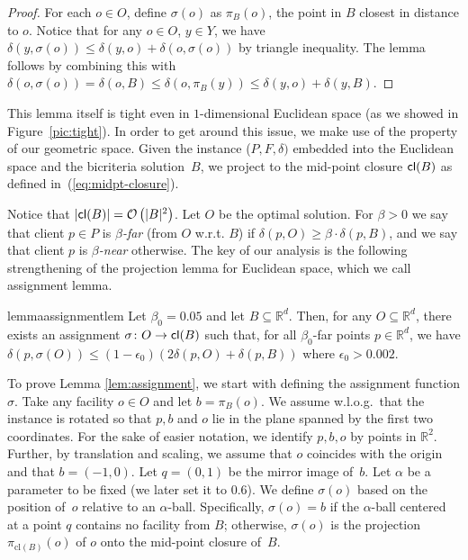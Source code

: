 \documentclass[11pt]{article}
\newcommand{\bR}{\ensuremath{\mathbb{R}}\xspace}
\newcommand{\bigO}[1]{\ensuremath{\mathcal{O}\left(#1\right)}}
\begin{document}
\projection*
\begin{proof}
    For each $o \in O$, define $\sigma(o)$ as $\pi_B(o)$, the point in $B$ closest in distance to $o$. Notice that for any $o\in O$, $y\in Y$, we have $\delta(y, \sigma(o)) \leq \delta(y,o) + \delta(o, \sigma(o))$ by triangle inequality. The lemma follows by combining this with $\delta(o, \sigma(o)) = \delta(o,B) \leq \delta(o, \pi_B(y)) \leq \delta(y, o)+\delta(y,B)$.
\end{proof}


This lemma itself is tight even in $1$-dimensional Euclidean space (as we showed in Figure~\ref{pic:tight}). In order to get around this issue, we make use of the property of our geometric space. Given the instance ($P, F, \delta)$ embedded into the Euclidean space and the bicriteria solution~$B$, we project to the mid-point closure ${\sf cl}(B)$ as defined in~(\ref{eq:midpt-closure}).

Notice that $|{\sf cl}(B)| = \bigO{|B|^2}$. Let $O$ be the optimal solution. For $\beta >0$ we say that client $p \in P$ is \emph{$\beta$-far} (from $O$ w.r.t. $B$) if $\delta(p,O) \geq \beta \cdot \delta(p,B)$, and we say that client $p$ is \emph{$\beta$-near} otherwise.
 The key of our analysis is the following strengthening of the projection lemma for Euclidean space, which we call assignment lemma.
 
\begin{restatable}{lemma}{assignmentlem}
\label{lem:assignment}
 Let $\beta_0 = 0.05$ and let $B \subseteq {\mathbb R}^d$. Then, for any $O \subseteq {\mathbb R}^d$, there exists an assignment $\sigma\colon O \rightarrow {\sf cl}(B)$ such that, for all $\beta_0$-far points $p \in {\mathbb R}^d$, we have $\delta(p, \sigma(O)) \leq (1-\epsilon_0)(2 \delta(p, O) + \delta(p, B))$ where $\epsilon_0 > 0.002$.
\end{restatable}
    
To prove Lemma \ref{lem:assignment}, we start with defining the assignment function $\sigma$. 
Take any facility $o \in O$ and let $b = \pi_B(o)$. We assume w.l.o.g.\ that the instance is rotated so that $p,b$ and $o$ lie in the plane spanned by the first two coordinates. For the sake of easier notation, we identify $p,b,o$ by points in $\bR^2$. Further, by translation and scaling, we assume that $o$ coincides with the origin and that $b=(-1,0)$. Let $q=(0,1)$ be the mirror image of~$b$. Let $\alpha$ be a parameter to be fixed (we later set it to $0.6$). We define $\sigma(o)$ based on the position of~$o$ relative to an \(\alpha\)-ball. Specifically, $\sigma(o) = b$ if the $\alpha$-ball centered at a point $q$ contains no facility from $B$; otherwise, $\sigma(o)$ is the projection $\pi_{\text{cl}(B)}(o)$ of $o$ onto the mid-point closure of~$B$.
\end{document}
